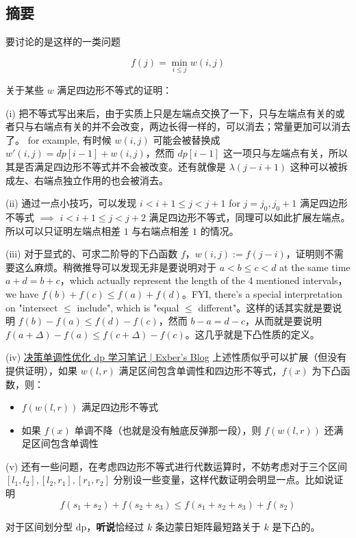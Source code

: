 \subsection{摘要}

要讨论的是这样的一类问题

$$
f(j) = \min_{i\le j}  w(i,j)
$$

关于某些 $w$ 满足四边形不等式的证明：

(i) 
把不等式写出来后，由于实质上只是左端点交换了一下，只与左端点有关的或者只与右端点有关的并不会改变，两边长得一样的，可以消去；常量更加可以消去了。
for example, 有时候 $w(i,j)$ 可能会被替换成 $w'(i,j) = dp[i-1] + w(i,j)$，然而 $dp[i-1]$ 这一项只与左端点有关，所以其是否满足四边形不等式并不会被改变。还有就像是 $\lambda(j-i+1)$ 这种可以被拆成左、右端点独立作用的也会被消去。

(ii)
通过一点小技巧，可以发现 $i<i+1\le j < j+1$ for $j=j_0,j_0+1$ 满足四边形不等式 $\implies$ $i<i+1\le j < j+2$ 满足四边形不等式，同理可以如此扩展左端点。
所以可以只证明左端点相差 $1$ 与右端点相差 $1$ 的情况。

(iii)
对于显式的、可求二阶导的下凸函数 $f$，$w(i,j) := f(j-i)$，证明则不需要这么麻烦。稍微推导可以发现无非是要说明对于 $a< b\le c< d$ at the same time $a+d = b+c$，which actually represent the length of the 4 mentioned intervals，we have $f(b) + f(c) \le f(a)+f(d)$。FYI, there's a special interpretation on "intersect $\le$ include", which is "equal $\le$ different"。这样的话其实就是要说明 $f(b) - f(a) \le f(d) - f(c)$，然而 $b-a = d-c$，从而就是要说明 $f(a+\Delta) - f(a) \le f(c+\Delta) - f(c)$。这几乎就是下凸性质的定义。

(iv)
\href{https://rebxe.github.io/post/jue-ce-dan-diao-xing-you-hua-dp-xue-xi-bi-ji/}{决策单调性优化 dp 学习笔记 | Exber's Blog}
上述性质似乎可以扩展（但没有提供证明），如果 $w(l,r)$ 满足区间包含单调性和四边形不等式，$f(x)$ 为下凸函数，则：
\begin{itemize}
    \item $f(w(l,r))$ 满足四边形不等式
    \item 如果 $f(x)$ 单调不降（也就是没有触底反弹那一段），则 $f(w(l,r))$ 还满足区间包含单调性
\end{itemize}

(v)
还有一些问题，在考虑四边形不等式进行代数运算时，不妨考虑对于三个区间 $[l_1,l_2],[l_2,r_1],[r_1,r_2]$ 分别设一些变量，这样代数证明会明显一点。比如说证明
$$
f(s_1+s_2) + f(s_2+s_3) \le f(s_1+s_2+s_3) + f(s_2)
$$

对于区间划分型 dp，\textbf{听说}恰经过 $k$ 条边蒙日矩阵最短路关于 $k$ 是下凸的。